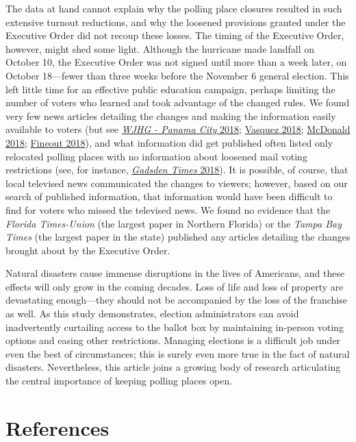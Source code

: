 \documentclass[
  12pt,
]{article}
\begin{document}
The data at hand cannot explain why the polling place closures resulted in such extensive turnout reductions, and why the loosened provisions granted under the Executive Order did not recoup these losses. The timing of the Executive Order, however, might shed some light. Although the hurricane made landfall on October 10, the Executive Order was not signed until more than a week later, on October 18---fewer than three weeks before the November 6 general election. This left little time for an effective public education campaign, perhaps limiting the number of voters who learned and took advantage of the changed rules. We found very few news articles detailing the changes and making the information easily available to voters (but see \protect\hyperlink{ref-WJHG2018}{\emph{WJHG - Panama City} 2018}; \protect\hyperlink{ref-Vasquez2018}{Vasquez 2018}; \protect\hyperlink{ref-McDonald2018}{McDonald 2018}; \protect\hyperlink{ref-Fineout2018}{Fineout 2018}), and what information did get published often listed only relocated polling places with no information about loosened mail voting restrictions (see, for instance, \protect\hyperlink{ref-gadsdentimes2018}{\emph{Gadsden Times} 2018}). It is possible, of course, that local televised news communicated the changes to viewers; however, based on our search of published information, that information would have been difficult to find for voters who missed the televised news. We found no evidence that the \emph{Florida Times-Union} (the largest paper in Northern Florida) or the \emph{Tampa Bay Times} (the largest paper in the state) published any articles detailing the changes brought about by the Executive Order.

Natural disasters cause immense disruptions in the lives of Americans, and these effects will only grow in the coming decades. Loss of life and loss of property are devastating enough---they should not be accompanied by the loss of the franchise as well. As this study demonstrates, election administrators can avoid inadvertently curtailing access to the ballot box by maintaining in-person voting options and easing other restrictions. Managing elections is a difficult job under even the best of circumstances; this is surely even more true in the fact of natural disasters. Nevertheless, this article joins a growing body of research articulating the central importance of keeping polling places open.

\newpage

\hypertarget{references}{%
\section*{References}\label{references}}
\end{document}

